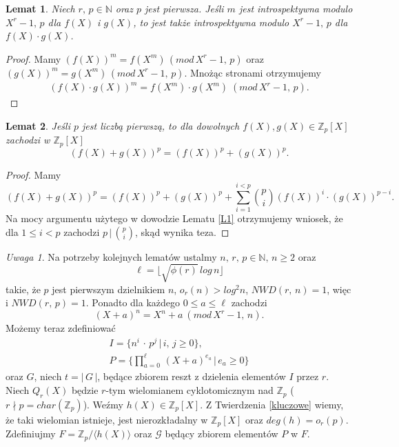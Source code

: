 \documentclass[declaration,shortabstract]{iithesis}
\theoremstyle{definition}
\theoremstyle{remark} \newtheorem{observation}{Obserwacja}
\theoremstyle{plain} \newtheorem{theorem}{Twierdzenie}
\theoremstyle{plain} \newtheorem{lemma}{Lemat}
\theoremstyle{remark} \newtheorem*{remark*}{Uwaga}
\theoremstyle{reminder} \newtheorem*{reminder*}{Przypomnienie}
\begin{document}
\begin{lemma}\label{intro2}
	Niech $r, \, p \in \mathbb{N}$ oraz $p$ jest pierwsza. Jeśli $m$ jest introspektywna modulo $X^r - 1, \, p$ dla $f(X)$ i $g(X)$, to jest także introspektywna modulo $X^r - 1, \, p$ dla ${f(X) \cdot g(X)}$.
\end{lemma}
	
\begin{proof}
	Mamy $(f(X))^m = f(X^m) \, (mod \, X^r - 1, \, p)$ oraz $(g(X))^m = g(X^m) \, (mod \, X^r - 1, \, p)$. Mnożąc stronami otrzymujemy 
	\begin{align*}
		(f(X) \cdot g(X))^m = f(X^m) \cdot g(X^m) \; (mod \, X^r - 1, \, p). 
	\end{align*}
\end{proof}

\begin{lemma}\label{p_intro}
	Jeśli $p$ jest liczbą pierwszą, to dla dowolnych $f(X), g(X) \in \mathbb{Z}_p[X]$ zachodzi w $\mathbb{Z}_p[X]$ \[(f(X) + g(X))^p = (f(X))^p + (g(X))^p.\]
\end{lemma}
	
\begin{proof}
	Mamy \[(f(X) + g(X))^p = (f(X))^p + (g(X))^p + \sum_{i=1}^{i < p}{p \choose i}(f(X))^i\cdot(g(X))^{p - i}.\] Na mocy argumentu użytego w dowodzie Lematu \ref{L1} otrzymujemy wniosek, że dla $1 \leq i < p$ zachodzi $p \, | \, {p \choose i}$, skąd wynika teza.
\end{proof}

\begin{remark*}\label{def}
	Na potrzeby kolejnych lematów ustalmy $n, \, r, \, p \in \mathbb{N}, \, n \geq 2 
	$ oraz \[\ell = \lfloor\sqrt{\phi (r)} \, log \, n \rfloor\] takie, że $p$ jest pierwszym dzielnikiem $n$, $o_r(n) > log^2n$, $NWD(r, \, n) = 1$, więc i $NWD(r, \, p) = 1$. Ponadto dla każdego $0 \leq a \leq \ell$ zachodzi \[(X + a)^n = X^n + a \: (mod \, X^r - 1, \, n).\] Możemy teraz zdefiniować 
	\begin{align*}
		I = \{n^i \, \cdot \, p^j \, | \, i, \, j \geq 0\},            \\
		P = \{\prod_{a=0}^{\ell} \, (X + a)^{e_a} \, | \, e_a \geq 0\} 
	\end{align*}
	oraz $G$, niech $t = | \, G \, |$, będące zbiorem reszt z dzielenia elementów $I$ przez $r$. Niech $Q_r(X)$ będzie $r$-tym wielomianem cyklotomicznym nad $\mathbb{Z}_p$ ($ r \nmid p = char(\mathbb{Z}_p)$). Weźmy $h(X) \in \mathbb{Z}_p[X]$. Z Twierdzenia \ref{kluczowe} wiemy, że taki wielomian istnieje, jest nierozkładalny w $\mathbb{Z}_p[X]$ oraz $deg(h) = o_r(p)$. Zdefiniujmy $F = \mathbb{Z}_p / \langle h(X) \rangle$ oraz $\mathcal{G}$ będący zbiorem elementów $P$ w $F$.
\end{remark*}
\end{document}
